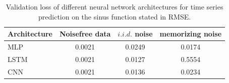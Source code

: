 \documentclass{article}
\begin{document}
\begin{table}
  \centering
  \begin{tabular}{l|c|c|c}
    Architecture & Noisefree data & $i.i.d.$ noise & memorizing noise \\
    \hline
    MLP          & 0.0021         & 0.0249         & 0.0174           \\
    LSTM         & 0.0021         & 0.0127         & 0.5554           \\
    CNN          & 0.0021         & 0.0136         & 0.0234           \\
  \end{tabular}
  \caption{Validation loss of different neural network architectures for
    time series prediction on the sinus function stated
    in RMSE.}
  \label{tab:noise_finals}
\end{table}
\end{document}
